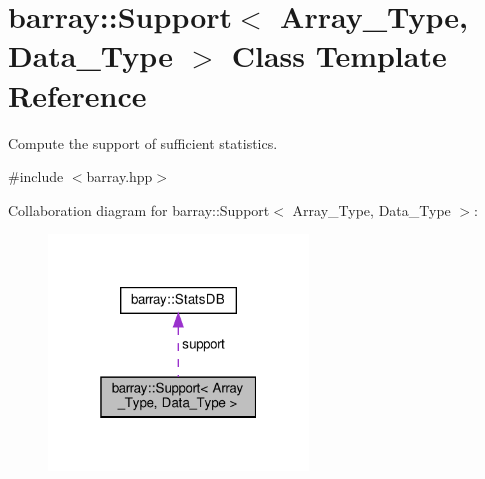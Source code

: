 \hypertarget{classbarray_1_1_support}{}\section{barray\+:\+:Support$<$ Array\+\_\+\+Type, Data\+\_\+\+Type $>$ Class Template Reference}
\label{classbarray_1_1_support}


Compute the support of sufficient statistics.  




{\ttfamily \#include $<$barray.\+hpp$>$}



Collaboration diagram for barray\+:\+:Support$<$ Array\+\_\+\+Type, Data\+\_\+\+Type $>$\+:\nopagebreak
\begin{figure}[H]
\begin{center}
\leavevmode
\includegraphics[width=196pt]{classbarray_1_1_support__coll__graph}
\end{center}
\end{figure}
